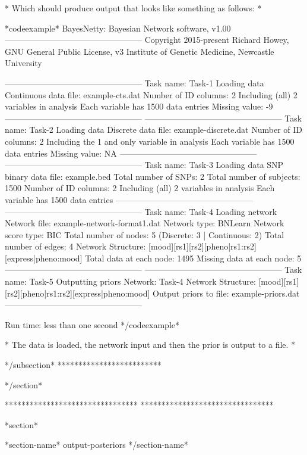 * Which should produce output that looks like something as follows: *

*codeexample* BayesNetty: Bayesian Network software, v1.00 -------------------------------------------------- Copyright 2015-present Richard Howey, GNU General Public License, v3 Institute of Genetic Medicine, Newcastle University

-------------------------------------------------- Task name: Task-1 Loading data Continuous data file: example-cts.dat Number of ID columns: 2 Including (all) 2 variables in analysis Each variable has 1500 data entries Missing value: -9 -------------------------------------------------- -------------------------------------------------- Task name: Task-2 Loading data Discrete data file: example-discrete.dat Number of ID columns: 2 Including the 1 and only variable in analysis Each variable has 1500 data entries Missing value: NA -------------------------------------------------- -------------------------------------------------- Task name: Task-3 Loading data SNP binary data file: example.bed Total number of SNPs: 2 Total number of subjects: 1500 Number of ID columns: 2 Including (all) 2 variables in analysis Each variable has 1500 data entries -------------------------------------------------- -------------------------------------------------- Task name: Task-4 Loading network Network file: example-network-format1.dat Network type: BNLearn Network score type: BIC Total number of nodes: 5 (Discrete: 3 | Continuous: 2) Total number of edges: 4 Network Structure: [mood][rs1][rs2][pheno|rs1:rs2][express|pheno:mood] Total data at each node: 1495 Missing data at each node: 5 -------------------------------------------------- -------------------------------------------------- Task name: Task-5 Outputting priors Network: Task-4 Network Structure: [mood][rs1][rs2][pheno|rs1:rs2][express|pheno:mood] Output priors to file: example-priors.dat --------------------------------------------------

Run time: less than one second */codeexample*

* The data is loaded, the network input and then the prior is output to a file. *



*/subsection* *************************

*/section*

******************************** ********************************

*section*

*section-name* output-posteriors */section-name*

